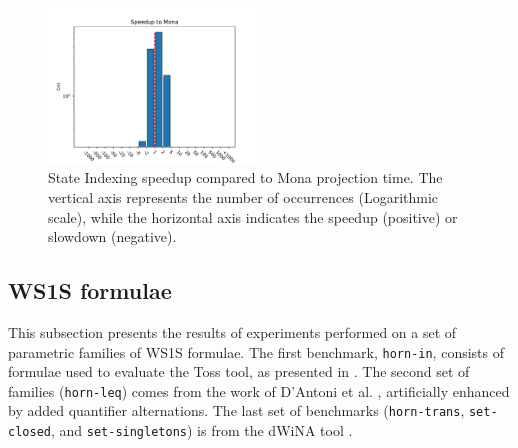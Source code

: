 \documentclass[pdflatex,sn-mathphys-num]{sn-jnl}%
\theoremstyle{thmstyleone}%
\theoremstyle{thmstyletwo}%
\theoremstyle{thmstylethree}%
\begin{document}
            \vspace*{-3em}

            \begin{figure}[h!]
                \centering
                \includegraphics[width=0.49\textwidth]{Figures/projection-first-speedup.pdf}
                \caption{State Indexing speedup compared to Mona projection time. The vertical axis represents the number of occurrences (Logarithmic scale), while the horizontal axis indicates the speedup (positive) or slowdown (negative).}
                \label{figure:projection_first_speedup}
            \end{figure}

    \vspace*{-2em}

    \subsection{WS1S formulae}
        This subsection presents the results of experiments performed on a set of parametric families of WS1S formulae. The first benchmark, \texttt{horn-in}, consists of formulae used to evaluate the Toss tool, as presented in \cite{TOSS}. The second set of families (\texttt{horn-leq}) comes from the work of D'Antoni et al. \cite{DAntoni}, artificially enhanced by added quantifier alternations. The last set of benchmarks (\texttt{horn-trans}, \texttt{set-closed}, and \texttt{set-singletons}) is from the dWiNA tool \cite{dWiNA}.
\end{document}
